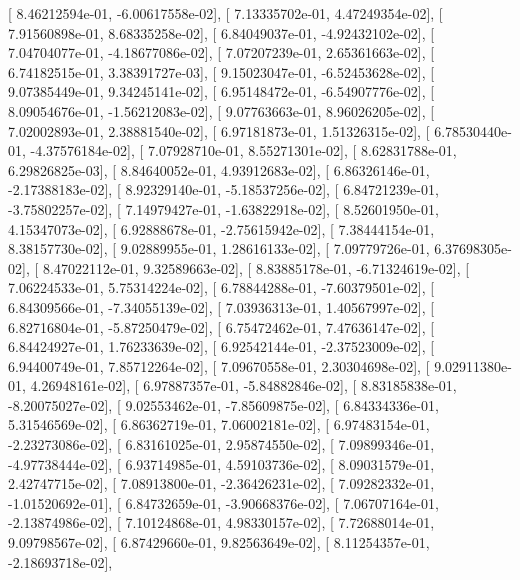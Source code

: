 \documentclass{article}
\begin{document}
       [  8.46212594e-01,  -6.00617558e-02],
       [  7.13335702e-01,   4.47249354e-02],
       [  7.91560898e-01,   8.68335258e-02],
       [  6.84049037e-01,  -4.92432102e-02],
       [  7.04704077e-01,  -4.18677086e-02],
       [  7.07207239e-01,   2.65361663e-02],
       [  6.74182515e-01,   3.38391727e-03],
       [  9.15023047e-01,  -6.52453628e-02],
       [  9.07385449e-01,   9.34245141e-02],
       [  6.95148472e-01,  -6.54907776e-02],
       [  8.09054676e-01,  -1.56212083e-02],
       [  9.07763663e-01,   8.96026205e-02],
       [  7.02002893e-01,   2.38881540e-02],
       [  6.97181873e-01,   1.51326315e-02],
       [  6.78530440e-01,  -4.37576184e-02],
       [  7.07928710e-01,   8.55271301e-02],
       [  8.62831788e-01,   6.29826825e-03],
       [  8.84640052e-01,   4.93912683e-02],
       [  6.86326146e-01,  -2.17388183e-02],
       [  8.92329140e-01,  -5.18537256e-02],
       [  6.84721239e-01,  -3.75802257e-02],
       [  7.14979427e-01,  -1.63822918e-02],
       [  8.52601950e-01,   4.15347073e-02],
       [  6.92888678e-01,  -2.75615942e-02],
       [  7.38444154e-01,   8.38157730e-02],
       [  9.02889955e-01,   1.28616133e-02],
       [  7.09779726e-01,   6.37698305e-02],
       [  8.47022112e-01,   9.32589663e-02],
       [  8.83885178e-01,  -6.71324619e-02],
       [  7.06224533e-01,   5.75314224e-02],
       [  6.78844288e-01,  -7.60379501e-02],
       [  6.84309566e-01,  -7.34055139e-02],
       [  7.03936313e-01,   1.40567997e-02],
       [  6.82716804e-01,  -5.87250479e-02],
       [  6.75472462e-01,   7.47636147e-02],
       [  6.84424927e-01,   1.76233639e-02],
       [  6.92542144e-01,  -2.37523009e-02],
       [  6.94400749e-01,   7.85712264e-02],
       [  7.09670558e-01,   2.30304698e-02],
       [  9.02911380e-01,   4.26948161e-02],
       [  6.97887357e-01,  -5.84882846e-02],
       [  8.83185838e-01,  -8.20075027e-02],
       [  9.02553462e-01,  -7.85609875e-02],
       [  6.84334336e-01,   5.31546569e-02],
       [  6.86362719e-01,   7.06002181e-02],
       [  6.97483154e-01,  -2.23273086e-02],
       [  6.83161025e-01,   2.95874550e-02],
       [  7.09899346e-01,  -4.97738444e-02],
       [  6.93714985e-01,   4.59103736e-02],
       [  8.09031579e-01,   2.42747715e-02],
       [  7.08913800e-01,  -2.36426231e-02],
       [  7.09282332e-01,  -1.01520692e-01],
       [  6.84732659e-01,  -3.90668376e-02],
       [  7.06707164e-01,  -2.13874986e-02],
       [  7.10124868e-01,   4.98330157e-02],
       [  7.72688014e-01,   9.09798567e-02],
       [  6.87429660e-01,   9.82563649e-02],
       [  8.11254357e-01,  -2.18693718e-02],
\end{document}
